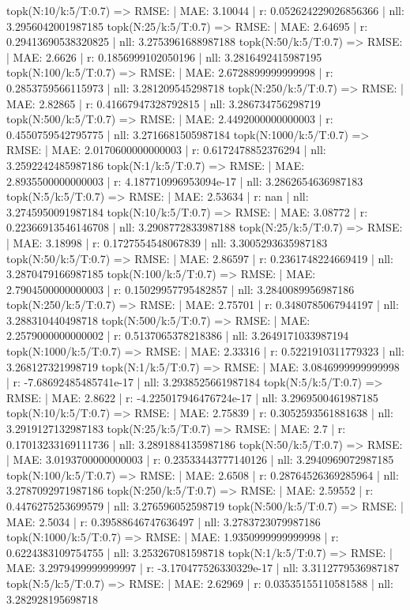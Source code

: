 topk(N:10/k:5/T:0.7) => RMSE: | MAE: 3.10044 | r: 0.052624229026856366 | nll: 3.2956042001987185
topk(N:25/k:5/T:0.7) => RMSE: | MAE: 2.64695 | r: 0.29413690538320825 | nll: 3.2753961688987188
topk(N:50/k:5/T:0.7) => RMSE: | MAE: 2.6626 | r: 0.1856999102050196 | nll: 3.2816492415987195
topk(N:100/k:5/T:0.7) => RMSE: | MAE: 2.6728899999999998 | r: 0.2853759566115973 | nll: 3.281209545298718
topk(N:250/k:5/T:0.7) => RMSE: | MAE: 2.82865 | r: 0.41667947328792815 | nll: 3.286734756298719
topk(N:500/k:5/T:0.7) => RMSE: | MAE: 2.4492000000000003 | r: 0.4550759542795775 | nll: 3.2716681505987184
topk(N:1000/k:5/T:0.7) => RMSE: | MAE: 2.0170600000000003 | r: 0.6172478852376294 | nll: 3.2592242485987186
topk(N:1/k:5/T:0.7) => RMSE: | MAE: 2.8935500000000003 | r: 4.187710996953094e-17 | nll: 3.2862654636987183
topk(N:5/k:5/T:0.7) => RMSE: | MAE: 2.53634 | r: nan | nll: 3.2745950091987184
topk(N:10/k:5/T:0.7) => RMSE: | MAE: 3.08772 | r: 0.22366913546146708 | nll: 3.2908772833987188
topk(N:25/k:5/T:0.7) => RMSE: | MAE: 3.18998 | r: 0.1727554548067839 | nll: 3.3005293635987183
topk(N:50/k:5/T:0.7) => RMSE: | MAE: 2.86597 | r: 0.2361748224669419 | nll: 3.2870479166987185
topk(N:100/k:5/T:0.7) => RMSE: | MAE: 2.7904500000000003 | r: 0.15029957795482857 | nll: 3.2840089956987186
topk(N:250/k:5/T:0.7) => RMSE: | MAE: 2.75701 | r: 0.3480785067944197 | nll: 3.288310440498718
topk(N:500/k:5/T:0.7) => RMSE: | MAE: 2.2579000000000002 | r: 0.5137065378218386 | nll: 3.2649171033987194
topk(N:1000/k:5/T:0.7) => RMSE: | MAE: 2.33316 | r: 0.5221910311779323 | nll: 3.268127321998719
topk(N:1/k:5/T:0.7) => RMSE: | MAE: 3.0846999999999998 | r: -7.68692485485741e-17 | nll: 3.2938525661987184
topk(N:5/k:5/T:0.7) => RMSE: | MAE: 2.8622 | r: -4.225017946476724e-17 | nll: 3.2969500461987185
topk(N:10/k:5/T:0.7) => RMSE: | MAE: 2.75839 | r: 0.3052593561881638 | nll: 3.2919127132987183
topk(N:25/k:5/T:0.7) => RMSE: | MAE: 2.7 | r: 0.17013233169111736 | nll: 3.2891884135987186
topk(N:50/k:5/T:0.7) => RMSE: | MAE: 3.0193700000000003 | r: 0.23533443777140126 | nll: 3.2940969072987185
topk(N:100/k:5/T:0.7) => RMSE: | MAE: 2.6508 | r: 0.28764526369285964 | nll: 3.2787092971987186
topk(N:250/k:5/T:0.7) => RMSE: | MAE: 2.59552 | r: 0.4476275253699579 | nll: 3.276596052598719
topk(N:500/k:5/T:0.7) => RMSE: | MAE: 2.5034 | r: 0.39588646747636497 | nll: 3.2783723079987186
topk(N:1000/k:5/T:0.7) => RMSE: | MAE: 1.9350999999999998 | r: 0.6224383109754755 | nll: 3.253267081598718
topk(N:1/k:5/T:0.7) => RMSE: | MAE: 3.2979499999999997 | r: -3.170477526330329e-17 | nll: 3.3112779536987187
topk(N:5/k:5/T:0.7) => RMSE: | MAE: 2.62969 | r: 0.03535155110581588 | nll: 3.282928195698718
